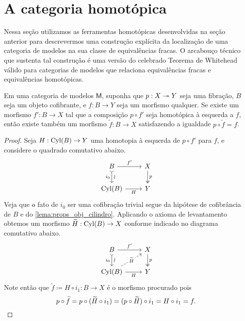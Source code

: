 \section{A categoria homotópica}

Nessa seção utilizamos as ferramentas homotópicas desenvolvidas na seção anterior para descrevermos uma construção explícita da localização de uma categoria de modelos na sua classe de equivalências fracas.
O arcabouço técnico que sustenta tal construção é uma versão do celebrado Teorema de Whitehead válido para categorias de modelos que relaciona equivalências fracas e equivalências homotópicas.

\begin{lema}
  \label{lema:levantamento_a_menos_de_homotopia}
  Em uma categoria de modelos $\mathsf{M}$, suponha que $p: X \twoheadrightarrow Y$ seja uma fibração, $B$ seja um objeto cofibrante, e $f: B \to Y$ seja um morfismo qualquer.
  Se existe um morfismo $f': B \to X$ tal que a composição $p \circ f'$ seja homotópica à esquerda a $f$, então existe também um morfismo $\widetilde{f}: B \to X$ satisfazendo a igualdade $p \circ \widetilde{f} = f$.
\end{lema}

\begin{proof}
  Seja $H: \mathrm{Cyl}(B) \to Y$ uma homotopia à esquerda de $p \circ f'$ para $f$, e considere o quadrado comutativo abaixo.
  \begin{displaymath}
    \begin{tikzcd}
      B
      \arrow[d, tail, "\sim" {sloped}, "i_{0}" {swap}]
      \arrow[r, "f'"]
      & X
      \arrow[d, two heads, "p"]
      \\ \Cyl(B)
      \arrow[r, "H" swap]
      & Y
    \end{tikzcd}
  \end{displaymath}
  Veja que o fato de $i_{0}$ ser uma cofibração trivial segue da hipótese de cofibrância de $B$ e do \cref{lema:props_obj_cilindro}.
  Aplicando o axioma de levantamento obtemos um morfismo $\widetilde{H}: \mathrm{Cyl}(B) \to X$ conforme indicado no diagrama comutativo abaixo.
  \begin{displaymath}
    \begin{tikzcd}
      B
      \arrow[d, tail, "\sim" {sloped}, "i_{0}" {swap}]
      \arrow[r, "f'"]
      & X
      \arrow[d, two heads, "p"]
      \\ \Cyl(B)
      \arrow[r, "H" swap]
      \arrow[ru, dashed, "\widetilde{H}" description]
      & Y
    \end{tikzcd}
  \end{displaymath}
  Note então que $\widetilde{f} \coloneqq H \circ i_{1}: B \to X$ é o morfismo procurado pois
  \begin{displaymath}
    p \circ \widetilde{f} = p \circ (\widetilde{H} \circ i_{1}) = (p \circ \widetilde{H}) \circ i_{1} = H \circ i_{1} = f. \qedhere
  \end{displaymath}
\end{proof}

